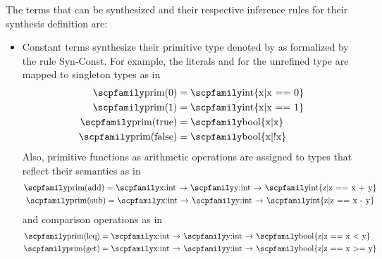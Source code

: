 \documentclass[
  oneside,
  english,
  coorientadorbanca,
  noabntexcite
]{ufsc-thesis-rn46-2019}
\newcommand{\code}[1]{\text{\scpfamily\setlength\spaceskip{0.35em}#1}}
\newcommand{\fnty}[2]{\code{#1 $\rightarrow$ #2}}
\begin{document}
The terms that can be synthesized and their respective inference rules for their synthesis definition are:
\begin{itemize}
  \item Constant terms \code{c} synthesize their primitive type denoted by \code{prim(c)} as formalized by the rule Syn-Const.
        For example, the literals \code{0} and \code{1} for the unrefined type \code{int} are mapped to singleton types as in
        \begin{align*}
          \code{prim(0)}     & = \code{int\{x|x == 0\}} \\
          \code{prim(1)}     & = \code{int\{x|x == 1\}} \\
          \code{prim(true)}  & = \code{bool\{x|x\}}     \\
          \code{prim(false)} & = \code{bool\{x|!x\}}    \\
        \end{align*}
        Also, primitive functions as arithmetic operations are assigned to types that reflect their semantics as in
        \begin{gather*}
          \code{prim(add)} = \fnty{x:int}{\fnty{y:int}{\code{int\{z|z == x + y\}}}} \\
          \code{prim(sub)} = \fnty{x:int}{\fnty{y:int}{\code{int\{z|z == x - y\}}}} \\
        \end{gather*}
        and comparison operations as in
        \begin{align*}
          \code{prim(leq)} & = \fnty{x:int}{\fnty{y:int}{\code{bool\{z|z == x < y\}}}}  \\
          \code{prim(get)} & = \fnty{x:int}{\fnty{y:int}{\code{bool\{z|z == x >= y\}}}} \\
        \end{align*}


\end{itemize}
\end{document}
